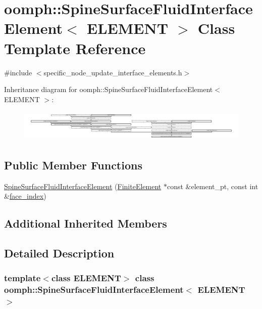 \hypertarget{classoomph_1_1SpineSurfaceFluidInterfaceElement}{}\section{oomph\+:\+:Spine\+Surface\+Fluid\+Interface\+Element$<$ E\+L\+E\+M\+E\+NT $>$ Class Template Reference}
\label{classoomph_1_1SpineSurfaceFluidInterfaceElement}


{\ttfamily \#include $<$specific\+\_\+node\+\_\+update\+\_\+interface\+\_\+elements.\+h$>$}

Inheritance diagram for oomph\+:\+:Spine\+Surface\+Fluid\+Interface\+Element$<$ E\+L\+E\+M\+E\+NT $>$\+:\begin{figure}[H]
\begin{center}
\leavevmode
\includegraphics[height=1.526405cm]{classoomph_1_1SpineSurfaceFluidInterfaceElement}
\end{center}
\end{figure}
\subsection*{Public Member Functions}
\begin{DoxyCompactItemize}
\item 
\hyperlink{classoomph_1_1SpineSurfaceFluidInterfaceElement_aa1d52a09e4f50085b957463a0da22d4a}{Spine\+Surface\+Fluid\+Interface\+Element} (\hyperlink{classoomph_1_1FiniteElement}{Finite\+Element} $\ast$const \&element\+\_\+pt, const int \&\hyperlink{classoomph_1_1FaceElement_a478d577ac6db67ecc80f1f02ae3ab170}{face\+\_\+index})
\end{DoxyCompactItemize}
\subsection*{Additional Inherited Members}


\subsection{Detailed Description}
\subsubsection*{template$<$class E\+L\+E\+M\+E\+NT$>$\newline
class oomph\+::\+Spine\+Surface\+Fluid\+Interface\+Element$<$ E\+L\+E\+M\+E\+N\+T $>$}



